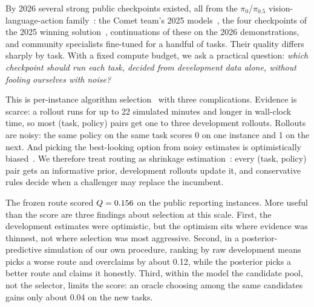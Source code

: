 \documentclass[10pt]{article}
\newcommand{\Q}{\ensuremath{Q}}
\begin{document}
By 2026 several strong public checkpoints existed, all from the $\pi_0$/$\pi_{0.5}$ vision-language-action family~\cite{black2024pi0,pi05,openpi}: the Comet team's 2025 models~\cite{bai2025comet}, the four checkpoints of the 2025 winning solution~\cite{larchenko2025task}, continuations of these on the 2026 demonstrations, and community specialists fine-tuned for a handful of tasks. Their quality differs sharply by task. With a fixed compute budget, we ask a practical question: \emph{which checkpoint should run each task, decided from development data alone, without fooling ourselves with noise?}

This is per-instance algorithm selection~\cite{rice1976algorithm,kerschke2019survey} with three complications. Evidence is scarce: a rollout runs for up to 22 simulated minutes and longer in wall-clock time, so most (task, policy) pairs get one to three development rollouts. Rollouts are noisy: the same policy on the same task scores 0 on one instance and 1 on the next. And picking the best-looking option from noisy estimates is optimistically biased~\cite{smith2006optimizer,efron2011tweedie}. We therefore treat routing as shrinkage estimation~\cite{efron1975stein}: every (task, policy) pair gets an informative prior, development rollouts update it, and conservative rules decide when a challenger may replace the incumbent.

The frozen route scored $\Q=\Qval$ on the public reporting instances. More useful than the score are three findings about selection at this scale. First, the development estimates were optimistic, but the optimism sits where evidence was thinnest, not where selection was most aggressive. Second, in a posterior-predictive simulation of our own procedure, ranking by raw development means picks a worse route and overclaims by about 0.12, while the posterior picks a better route and claims it honestly. Third, within the model the candidate pool, not the selector, limits the score: an oracle choosing among the same candidates gains only about 0.04 on the new tasks.
\end{document}

